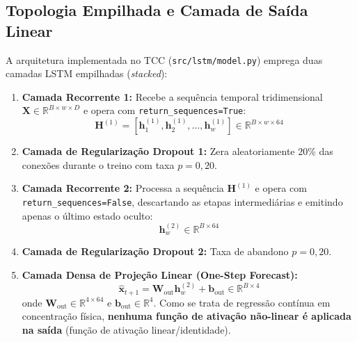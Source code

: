 \documentclass[11pt,a4paper]{article}
\begin{document}
\subsection{Topologia Empilhada e Camada de Saída Linear}
A arquitetura implementada no TCC (\texttt{src/lstm/model.py}) emprega duas camadas LSTM empilhadas (\textit{stacked}):
\begin{enumerate}
  \item \textbf{Camada Recorrente 1:} Recebe a sequência temporal tridimensional $\mathbf{X} \in \mathbb{R}^{B \times w \times D}$ e opera com \texttt{return\_sequences=True}:
  \begin{equation}
    \mathbf{H}^{(1)} = \left[ \mathbf{h}_1^{(1)}, \mathbf{h}_2^{(1)}, \dots, \mathbf{h}_w^{(1)} \right] \in \mathbb{R}^{B \times w \times 64}
  \end{equation}
  \item \textbf{Camada de Regularização Dropout 1:} Zera aleatoriamente $20\%$ das conexões durante o treino com taxa $p=0{,}20$.
  \item \textbf{Camada Recorrente 2:} Processa a sequência $\mathbf{H}^{(1)}$ e opera com \texttt{return\_sequences=False}, descartando as etapas intermediárias e emitindo apenas o último estado oculto:
  \begin{equation}
    \mathbf{h}_w^{(2)} \in \mathbb{R}^{B \times 64}
  \end{equation}
  \item \textbf{Camada de Regularização Dropout 2:} Taxa de abandono $p=0{,}20$.
  \item \textbf{Camada Densa de Projeção Linear (One-Step Forecast):}
  \begin{equation}
    \hat{\mathbf{x}}_{t+1} = \mathbf{W}_{\text{out}} \mathbf{h}_w^{(2)} + \mathbf{b}_{\text{out}} \in \mathbb{R}^{B \times 4}
  \end{equation}
  onde $\mathbf{W}_{\text{out}} \in \mathbb{R}^{4 \times 64}$ e $\mathbf{b}_{\text{out}} \in \mathbb{R}^4$. Como se trata de regressão contínua em concentração física, \textbf{nenhuma função de ativação não-linear é aplicada na saída} (função de ativação linear/identidade).
\end{enumerate}
\end{document}
